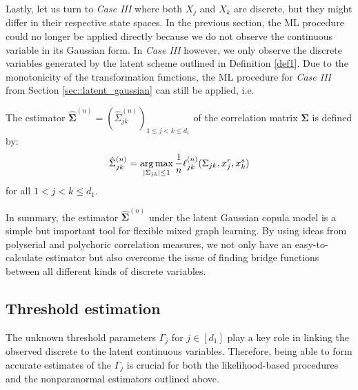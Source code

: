 Lastly, let us turn to \textit{Case III} where both $X_j$ and $X_k$ are discrete, but they might differ in their respective state spaces. In the previous section, the ML procedure could no longer be applied directly because we do not observe the continuous variable in its Gaussian form. In \textit{Case III} however, we only observe the discrete variables generated by the latent scheme outlined in Definition \ref{def1}. Due to the monotonicity of the transformation functions, the ML procedure for \textit{Case III} from Section \ref{sec::latent_gaussian} can still be applied, i.e.

\begin{definition}
    The estimator $\hat{\mathbf{\Sigma}}^{(n)} = (\hat{\Sigma}_{jk}^{(n)})_{1\leq j < k\leq d_1}$ of the correlation matrix $\mathbf{\Sigma}$ is defined by:
    \begin{equation}
            \hat{\Sigma}_{jk}^{(n)} = \argmax_{\Abs{\Sigma_{jk}} \leq 1} \frac{1}{n} \ell_{jk}^{(n)}(\Sigma_{jk}, x_j^r,x_k^s)
    \end{equation}
    for all $1 < j < k \leq d_1 $.
\end{definition}

In summary, the estimator $\hat{\mathbf{\Sigma}}^{(n)}$ under the latent Gaussian copula model is a simple but important tool for flexible mixed graph learning. By using ideas from polyserial and polychoric correlation measures, we not only have an easy-to-calculate estimator but also overcome the issue of finding bridge functions between all different kinds of discrete variables.

\subsection{Threshold estimation}\label{sec::thresholds}

The unknown threshold parameters $\Gamma_j$ for \(j \in [d_1]\) play a key role in linking the observed discrete to the latent continuous variables. Therefore, being able to form accurate estimates of the $\Gamma_j$ is crucial for both the likelihood-based procedures and the nonparanormal estimators outlined above.

